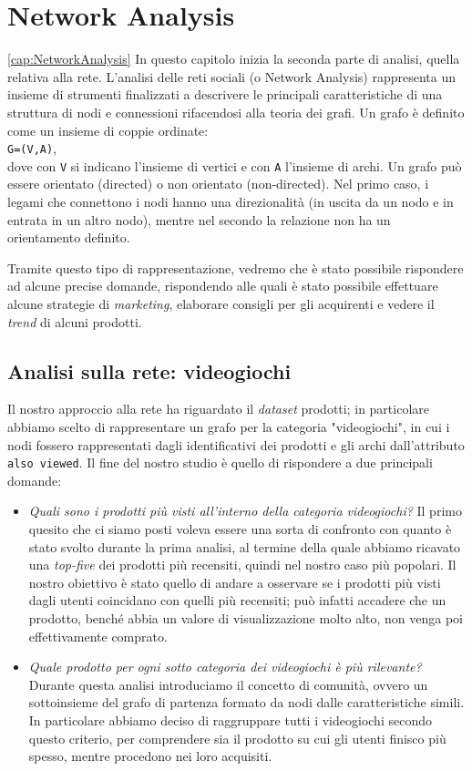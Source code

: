 \chapter{Network Analysis}
\ref{cap:NetworkAnalysis}
	In questo capitolo inizia la seconda parte di analisi, quella relativa alla rete. L’analisi delle reti sociali (o Network Analysis) rappresenta un insieme di strumenti finalizzati a descrivere le principali caratteristiche di una struttura di nodi e connessioni rifacendosi alla teoria dei grafi. Un grafo è definito come un insieme di coppie ordinate: \\
	\verb|G=(V,A)|, \\
	dove con \verb|V| si indicano l'insieme di vertici e con \verb|A| l'insieme di archi. Un grafo può essere orientato (directed) o non orientato (non-directed). Nel primo caso, i legami che connettono i nodi hanno una direzionalità (in uscita da un nodo e in entrata in un altro nodo), mentre nel secondo la relazione non ha un orientamento definito. 
	
	Tramite questo tipo di rappresentazione, vedremo che è stato possibile rispondere ad alcune precise domande, rispondendo alle quali è stato possibile effettuare alcune strategie di \textit{marketing}, elaborare consigli per gli acquirenti e vedere il \textit{trend} di alcuni prodotti.   
	
	
	\section{Analisi sulla rete: videogiochi}
		Il nostro approccio alla rete ha riguardato il \textit{dataset} prodotti; in particolare abbiamo scelto di rappresentare un grafo per la categoria "videogiochi", in cui i nodi fossero rappresentati dagli identificativi dei prodotti e gli archi dall'attributo \verb|also viewed|.	Il fine del nostro studio è quello di rispondere a due principali domande: 
		\begin{itemize}
			\item \textit{Quali sono i prodotti più visti all'interno della categoria videogiochi?}
			Il primo quesito che ci siamo posti voleva essere una sorta di confronto con quanto è stato svolto durante la prima analisi, al termine della quale abbiamo ricavato una \textit{top-five} dei prodotti più recensiti, quindi nel nostro caso più popolari. Il nostro obiettivo è stato quello di andare a osservare se i prodotti più visti dagli utenti coincidano con quelli più recensiti; può infatti accadere che un prodotto, benché abbia un valore di visualizzazione molto alto, non venga poi effettivamente comprato.
			
			\item \textit{Quale prodotto per ogni sotto categoria dei videogiochi è più rilevante?}
			Durante questa analisi introduciamo il concetto di comunità, ovvero un sottoinsieme del grafo di partenza formato da nodi dalle caratteristiche simili. In particolare abbiamo deciso di raggruppare tutti i videogiochi secondo questo criterio, per comprendere sia il prodotto su cui gli utenti finisco più spesso, mentre procedono nei loro acquisiti.
		\end{itemize}
	

